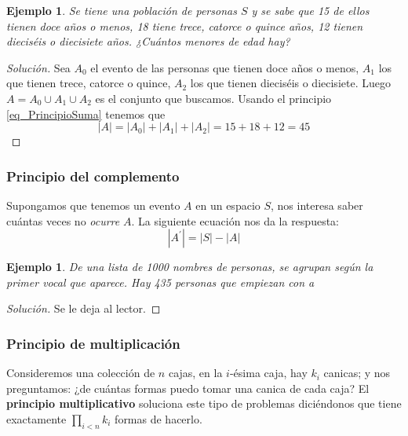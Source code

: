 \documentclass[spanish]{report}
\newtheorem{ejm}[thm]{Ejemplo}
\newcommand{\card}[1]{\left|#1 \right|}
\begin{document}
\begin{ejm}
	Se tiene una población de personas $S$ y se sabe que 15 de ellos tienen doce años o menos, 18 tiene trece, catorce o quince años, 12 tienen dieciséis o diecisiete años. ¿Cuántos menores de edad hay?
\end{ejm}
\begin{proof}[Solución]
	Sea $A_0$ el evento de las personas que tienen doce años o menos, $A_1$ los que tienen trece, catorce o quince, $A_2$ los que tienen dieciséis o diecisiete.
	Luego $A = A_0 \cup A_1 \cup A_2$ es el conjunto que buscamos. Usando el principio \ref{eq_PrincipioSuma} tenemos que \[\card{A} = \card{A_0}+\card{A_1}+\card{A_2} = 15+18+12= 45\]
\end{proof}

\subsubsection{Principio del complemento} %

Supongamos que tenemos un evento $A$ en un espacio $S$, nos interesa saber cuántas veces no \emph{ocurre} $A$. La siguiente ecuación nos da la respuesta:
\begin{equation}\label{eq_PrincipioComplemento}
	\card{A^\prime} = \card{S} - \card{A}
\end{equation}

\begin{ejm}
	De una lista de 1000 nombres de personas, se agrupan según la primer vocal que aparece. Hay 435 personas que empiezan con \emph{a} %
\end{ejm}
\begin{proof}[Solución]
	Se le deja al lector.
\end{proof}

\subsubsection{Principio de multiplicación}
Consideremos una colección de $n$ cajas, en la $i$-ésima caja, hay $k_i$ canicas; y nos preguntamos: ¿de cuántas formas puedo tomar una canica de cada caja?
El \textbf{principio multiplicativo} soluciona este tipo de problemas diciéndonos que tiene exactamente $\prod_{i<n}k_i$ formas de hacerlo.
\end{document}
